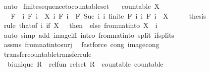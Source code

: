 \begin{isabellebody}
\ auto%
\endisatagproof
{\isafoldproof}%
%
\isadelimproof
\isanewline
%
\endisadelimproof
\isanewline
{}\isamarkupfalse%
\ finite{\isacharunderscore}sequence{\isacharunderscore}to{\isacharunderscore}countable{\isacharunderscore}set{\isacharcolon}\isanewline
\ \ \ {\isachardoublequoteopen}countable\ X{\isachardoublequoteclose}\isanewline
\ \ \ F\ \ {\isachardoublequoteopen}{\isasymAnd}i{\isachardot}\ F\ i\ {\isasymsubseteq}\ X{\isachardoublequoteclose}\ {\isachardoublequoteopen}{\isasymAnd}i{\isachardot}\ F\ i\ {\isasymsubseteq}\ F\ {\isacharparenleft}Suc\ i{\isacharparenright}{\isachardoublequoteclose}\ {\isachardoublequoteopen}{\isasymAnd}i{\isachardot}\ finite\ {\isacharparenleft}F\ i{\isacharparenright}{\isachardoublequoteclose}\ {\isachardoublequoteopen}{\isacharparenleft}{\isasymUnion}i{\isachardot}\ F\ i{\isacharparenright}\ {\isacharequal}\ X{\isachardoublequoteclose}\isanewline
%
\isadelimproof
%
\endisadelimproof
%
\isatagproof
{}\isamarkupfalse%
\ {\isacharminus}\isanewline
\ \ \isamarkupfalse%
\ thesis\isanewline
\ \ \ \ \isamarkupfalse%
\ {\isacharparenleft}rule\ that{\isacharbrackleft}of\ {\isachardoublequoteopen}{\isasymlambda}i{\isachardot}\ if\ X\ {\isacharequal}\ {\isacharbraceleft}{\isacharbraceright}\ then\ {\isacharbraceleft}{\isacharbraceright}\ else\ from{\isacharunderscore}nat{\isacharunderscore}into\ X\ {\isacharbackquote}\ {\isacharbraceleft}{\isachardot}{\isachardot}i{\isacharbraceright}{\isachardoublequoteclose}{\isacharbrackright}{\isacharparenright}\isanewline
\ \ \ \ \ \ \ \isamarkupfalse%
\ {\isacharparenleft}auto\ simp\ add{\isacharcolon}\ image{\isacharunderscore}iff\ intro{\isacharcolon}\ from{\isacharunderscore}nat{\isacharunderscore}into\ split{\isacharcolon}\ if{\isacharunderscore}splits{\isacharparenright}\isanewline
\ \ \ \ \isamarkupfalse%
\ assms\ from{\isacharunderscore}nat{\isacharunderscore}into{\isacharunderscore}surj\ \isamarkupfalse%
\ {\isacharparenleft}fastforce\ cong{\isacharcolon}\ image{\isacharunderscore}cong{\isacharparenright}\isanewline
{}\isamarkupfalse%
%
\endisatagproof
{\isafoldproof}%
%
\isadelimproof
\isanewline
%
\endisadelimproof
\isanewline
{}\isamarkupfalse%
\ transfer{\isacharunderscore}countable{\isacharbrackleft}transfer{\isacharunderscore}rule{\isacharbrackright}{\isacharcolon}\isanewline
\ \ {\isachardoublequoteopen}bi{\isacharunderscore}unique\ R\ {\isasymLongrightarrow}\ rel{\isacharunderscore}fun\ {\isacharparenleft}rel{\isacharunderscore}set\ R{\isacharparenright}\ {\isacharparenleft}{\isacharequal}{\isacharparenright}\ countable\ countable{\isachardoublequoteclose}\isanewline

\end{isabellebody}
